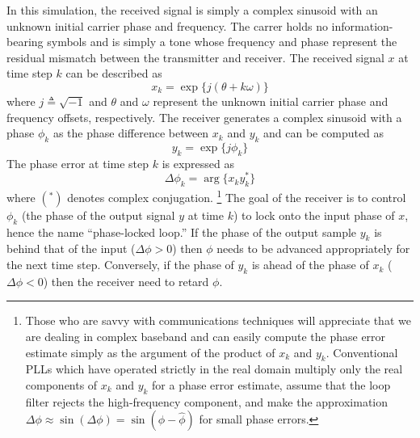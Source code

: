 In this simulation, the received signal is simply a complex sinusoid
with an unknown initial carrier phase and frequency.
The carrer holds no information-bearing symbols and is simply a tone
whose frequency and phase represent the residual mismatch between the
transmitter and receiver.
The received signal $x$ at time step $k$ can be described as
%
\begin{equation}
\label{eqn:tutoral:pll:x}
    x_k = \exp\bigl\{ j(\theta + k\omega) \bigr\}
\end{equation}
%
where $j \triangleq \sqrt{-1}$ and
$\theta$ and $\omega$ represent the unknown initial carrier phase and
frequency offsets, respectively.
The receiver generates a complex sinusoid with a phase $\phi_k$ as the
phase difference between $x_k$ and $y_k$ and can be computed as
%
\begin{equation}
\label{eqn:tutoral:pll:y}
    y_k = \exp\bigl\{j\phi_k\bigr\}
\end{equation}
%
The phase error at time step $k$ is expressed as
%
\begin{equation}
\label{eqn:tutoral:pll:dphi}
    \Delta\phi_k = \arg\bigl\{ x_k y_k^* \bigr\}
\end{equation}
%
where $(^*)$ denotes complex conjugation.%
\footnote{
    Those who are savvy with communications techniques will
    appreciate that we are dealing in complex baseband and can easily
    compute the phase error estimate simply as the argument of the
    product of $x_k$ and $y_k$.
    Conventional PLLs which have operated strictly in the real domain
    multiply only the real components of $x_k$ and $y_k$ for a phase
    error estimate, assume that the loop filter rejects the
    high-frequency component, and make the approximation
    $\Delta\phi \approx \sin(\Delta\phi) = \sin(\phi-\hat{\phi})$
    for small phase errors.}
The goal of the receiver is to control $\phi_k$
(the phase of the output signal $y$ at time $k$)
to lock onto the input phase of $x$,
hence the name ``phase-locked loop.''
If the phase of the output sample $y_k$ is behind that of the input
($\Delta\phi > 0$) then $\phi$ needs to be advanced appropriately for
the next time step.
Conversely, if the phase of $y_k$ is ahead of the phase of $x_k$
($\Delta\phi < 0$) then the receiver need to retard $\phi$.

